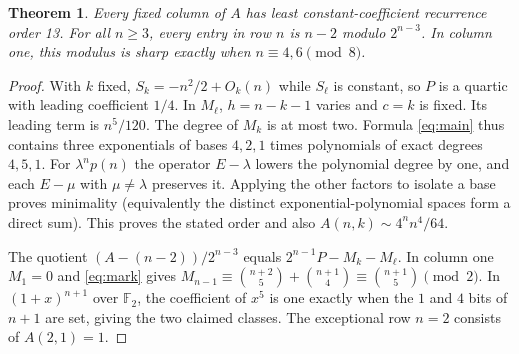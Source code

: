 \documentclass[11pt,letterpaper]{article}
\newtheorem{theorem}{Theorem}[section]
\begin{document}
\begin{theorem}\label{th:conseq}
Every fixed column of $A$ has least constant-coefficient recurrence order 13. For all $n\ge3$, every entry in row $n$ is $n-2$ modulo $2^{n-3}$. In column one, this modulus is sharp exactly when $n\equiv4,6\pmod8$.
\end{theorem}
\begin{proof}
With $k$ fixed, $S_k=-n^2/2+O_k(n)$ while $S_\ell$ is constant, so $P$ is a quartic with leading coefficient $1/4$. In $M_\ell$, $h=n-k-1$ varies and $c=k$ is fixed. Its leading term is $n^5/120$. The degree of $M_k$ is at most two. Formula \eqref{eq:main} thus contains three exponentials of bases $4,2,1$ times polynomials of exact degrees $4,5,1$. For $\lambda^n p(n)$ the operator $E-\lambda$ lowers the polynomial degree by one, and each $E-\mu$ with $\mu\ne\lambda$ preserves it. Applying the other factors to isolate a base proves minimality (equivalently the distinct exponential-polynomial spaces form a direct sum). This proves the stated order and also $A(n,k)\sim4^n n^4/64$.

The quotient $(A-(n-2))/2^{n-3}$ equals $2^{n-1}P-M_k-M_\ell$. In column one $M_1=0$ and \eqref{eq:mark} gives $M_{n-1}\equiv\binom{n+2}{5}+\binom{n+1}{4}\equiv\binom{n+1}{5}\pmod2$. In $(1+x)^{n+1}$ over $\mathbb F_2$, the coefficient of $x^5$ is one exactly when the $1$ and $4$ bits of $n+1$ are set, giving the two claimed classes. The exceptional row $n=2$ consists of $A(2,1)=1$.
\end{proof}

\newpage
\end{document}
